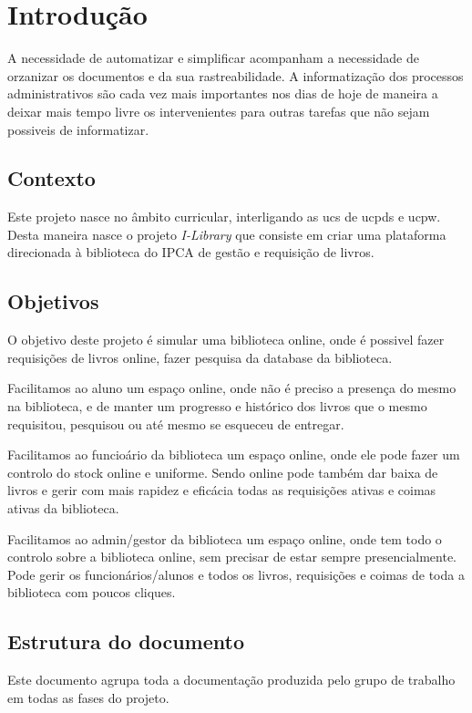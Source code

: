 
\chapter{Introdução}

A necessidade de automatizar e simplificar acompanham a necessidade de orzanizar os documentos e da sua rastreabilidade. A informatização dos processos administrativos são cada vez mais importantes nos dias de hoje de maneira a deixar mais tempo livre os intervenientes para outras tarefas que não sejam possiveis de informatizar. 

\section{Contexto}

Este projeto nasce no âmbito curricular, interligando as \acrshort{ucs} de \acrshort{ucpds} e \acrshort{ucpw}. Desta maneira nasce o projeto \textit{I-Library} que consiste em criar uma plataforma direcionada à biblioteca do IPCA de gestão e requisição de livros. 


\section{Objetivos}

O objetivo deste projeto é simular uma biblioteca online, onde é possivel fazer requisições de livros online, fazer pesquisa da database da biblioteca.

Facilitamos ao aluno um espaço online, onde não é preciso a presença do mesmo na biblioteca, e de manter um progresso e histórico dos livros que o mesmo requisitou, pesquisou ou até mesmo se esqueceu de entregar.

Facilitamos ao funcioário da biblioteca um espaço online, onde ele pode fazer um controlo do stock online e uniforme. Sendo online pode também dar baixa de livros e gerir com mais rapidez e eficácia todas as requisições ativas e coimas ativas da biblioteca.


Facilitamos ao admin/gestor da biblioteca um espaço online, onde tem todo o controlo sobre a biblioteca online, sem precisar de estar sempre presencialmente. Pode gerir os funcionários/alunos e todos os livros, requisições e coimas de toda a biblioteca com poucos cliques.



\clearpage

\section{Estrutura do documento}
Este documento agrupa toda a documentação produzida pelo grupo de trabalho em todas as fases do projeto.

